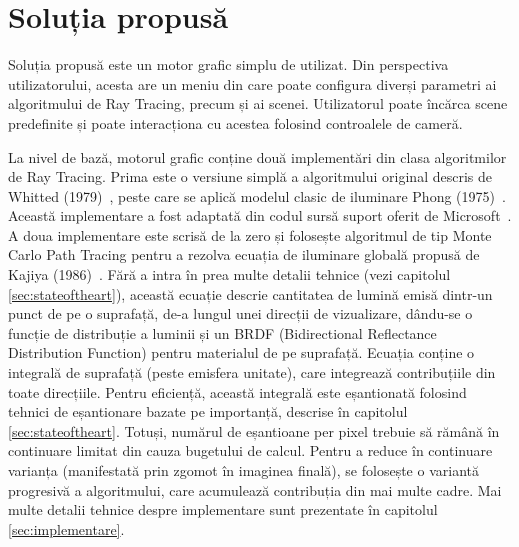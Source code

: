 \documentclass[12pt,a4paper]{report}
\numberwithin{equation}{section} %
\begin{document}
\subsubsection*{}

\section{Soluția propusă}
Soluția propusă este un motor grafic simplu de utilizat. Din perspectiva utilizatorului,
acesta are un meniu din care poate configura diverși parametri ai algoritmului
de Ray Tracing, precum și ai scenei. Utilizatorul poate încărca scene predefinite
și poate interacționa cu acestea folosind controalele de cameră.

La nivel de bază, motorul grafic conține două implementări din clasa algoritmilor
de Ray Tracing. Prima este o versiune simplă a algoritmului original descris de
Whitted (1979)~\cite{Whitted}, peste care se aplică modelul clasic de iluminare
Phong (1975)~\cite{Phong}. Această implementare a fost adaptată din codul sursă
suport oferit de Microsoft~\cite{Schelet}.
A doua implementare este scrisă de la zero și folosește algoritmul de tip Monte Carlo
Path Tracing pentru a rezolva ecuația de iluminare globală propusă de Kajiya (1986)~\cite{Kajiya}.
Fără a intra în prea multe detalii tehnice (vezi capitolul \ref{sec:stateoftheart}),
această ecuație descrie cantitatea de lumină emisă dintr-un punct de pe o suprafață,
de-a lungul unei direcții de vizualizare, dându-se o funcție de distribuție a luminii
și un BRDF (Bidirectional Reflectance Distribution Function) pentru materialul de pe
suprafață. Ecuația conține o integrală de suprafață (peste emisfera unitate), care
integrează contribuțiile din toate direcțiile. Pentru eficiență, această integrală
este eșantionată folosind tehnici de eșantionare bazate pe importanță, descrise în capitolul \ref{sec:stateoftheart}.
Totuși, numărul de eșantioane per pixel trebuie să rămână în continuare limitat din cauza bugetului de calcul. Pentru a reduce
în continuare varianța (manifestată prin zgomot în imaginea finală), se folosește
o variantă progresivă a algoritmului, care acumulează contribuția din mai multe cadre. Mai multe detalii tehnice
despre implementare sunt prezentate în capitolul \ref{sec:implementare}.
\end{document}
